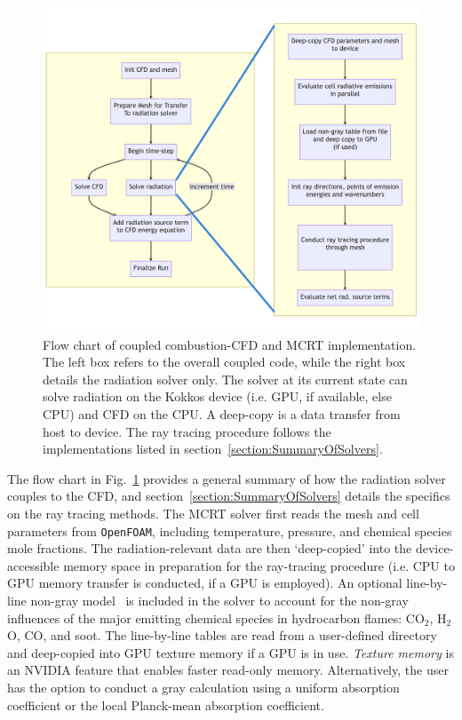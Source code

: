 \begin{figure}
  \centering
  \includegraphics[width=01.0\linewidth]{figures/ch3/joint_flow_chart.png}
  \caption{Flow chart of coupled combustion-CFD and MCRT implementation. The left box refers to the overall coupled code, while the right box details the radiation solver only. The solver at its current state can solve radiation on the Kokkos device (i.e. GPU, if available, else CPU) and CFD on the CPU. A deep-copy is a data transfer from host to device. The ray tracing procedure follows the implementations listed in section~\ref{section:SummaryOfSolvers}.}
  \label{fig:joint_flow_chart}
\end{figure}

The flow chart in Fig.~\ref{fig:joint_flow_chart} provides a general summary of how the radiation solver couples to the CFD, and section~\ref{section:SummaryOfSolvers} details the specifics on the ray tracing methods. The MCRT solver first reads the mesh and cell parameters from \texttt{OpenFOAM}, including temperature, pressure, and chemical species mole fractions. The radiation-relevant data are then `deep-copied' into the device-accessible memory space in preparation for the ray-tracing procedure (i.e. CPU to GPU memory transfer is conducted, if a GPU is employed). An optional line-by-line non-gray model~\cite{Ren2019Line-by-lineSystem} is included in the solver to account for the non-gray influences of the major emitting chemical species in hydrocarbon flames: CO$_2$, H$_2$O, CO, and soot.
The line-by-line tables are read from a user-defined directory and deep-copied into GPU texture memory if a GPU is in use. 
\textit{Texture memory} is an NVIDIA feature that enables faster read-only memory. Alternatively, the user has the option to conduct a gray calculation using a uniform absorption coefficient or the local Planck-mean absorption coefficient. 

